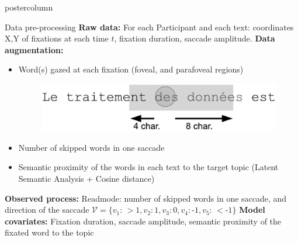 \documentclass[final,hyperref={pdfpagelabels=false}]{beamer}
\begin{document}
\begin{frame}
\begin{columns}
\begin{column}{.50\textwidth}
\begin{beamercolorbox}[center,wd=\textwidth]{postercolumn}
\begin{minipage}[T]{.98\textwidth}
{            \vfill
            \begin{block}{Data pre-processing}
                \textbf{Raw data:} For each Participant and each text: coordinates X,Y of fixations at each time $t$,
                fixation duration, saccade amplitude.
                \vskip0.5cm
                \textbf{Data augmentation:}
                \begin{itemize}
                    \item[\bullet]
                    \begin{minipage}{0.50\textwidth}
                        Word(s) gazed at each fixation (foveal, and parafoveal regions)
                    \end{minipage}
                    \begin{minipage}{0.40\textwidth}
                        \begin{figure}[H]
                            \includegraphics[width=0.8\linewidth]{fixation_window.jpg}
                        \end{figure}
                    \end{minipage}
                    \item[\bullet] Number of skipped words in one saccade
                    \item[\bullet] Semantic proximity of the words in each text to the target topic (Latent Semantic Analysis + Cosine distance)
                \end{itemize}
                \vskip0.5cm
                \textbf{Observed process:} Readmode:  number of skipped words in one saccade, and direction of the saccade
                $\mathcal{V} =\{ v_1:\,> \text{1}, v_2: \text{1}, v_3: \text{0}, v_4: \text{-1}, v_5:\,< \text{-1}\} $
                \vskip0.5cm
                \textbf{Model covariates:} Fixation duration, saccade amplitude, semantic proximity of the fixated word to the topic


\end{block}}
\end{minipage}
\end{beamercolorbox}
\end{column}
\end{columns}
\end{frame}
\end{document}
